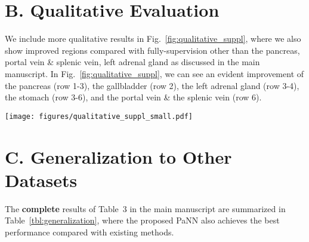 \documentclass[10pt,twocolumn,letterpaper]{article}
\begin{document}
\section* {B. Qualitative Evaluation}
\label{sec:visualization}
We include more qualitative results in Fig.~\ref{fig:qualitative_suppl}, where we also show improved regions compared with fully-supervision other than the pancreas, portal vein \& splenic vein, left adrenal gland as discussed in the main manuscript. In Fig.~\ref{fig:qualitative_suppl}, we can see an evident improvement of the pancreas (row 1-3), the gallbladder (row 2), the left adrenal gland (row 3-4), the stomach (row 3-6), and the portal vein \& the splenic vein (row 6).
\begin{figure*}[tb]
 	\centering
 	\texttt{[image: figures/qualitative\_suppl\_small.pdf]}
 	\caption{Qualitative comparison of different methods, where all the 3 partially-labeled datasets \textbf{A},\textbf{B},\textbf{C} are used as the partial supervision with ResNet-101 as the backbone model. We exhibit 5 cases (6 slices) as examples. Improved segmentation regions are zoomed in from the axial view to demonstrate finer details. Besides the pancreas, portal vein \& splenic vein, left adrenal gland, we also show other improved regions such as the stomach, gallbladder,~\etc.}
 	\label{fig:qualitative_suppl}
 	\vspace{-1em}
\end{figure*}


\section*{C. Generalization to Other Datasets}
The \textbf{complete} results of Table~3 in the main manuscript are summarized in Table~\ref{tbl:generalization}, where the proposed PaNN also achieves the best performance compared with existing methods.
\end{document}
